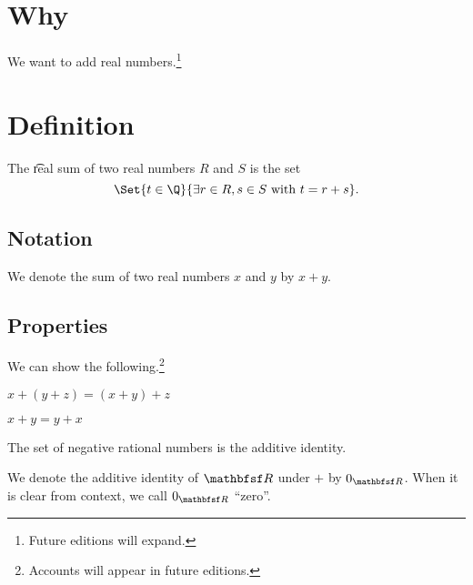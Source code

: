 
\section*{Why}

We want to add real numbers.\footnote{Future editions will expand.}

\section*{Definition}

The \t{real sum} of two real numbers $R$ and $S$ is the set
\[
\Set{t \in \Q }{\exists r \in R, s \in S \text{ with } t = r + s}.
\]

\subsection*{Notation}

We denote the sum of two real numbers $x$ and $y$ by $x + y$.

\subsection*{Properties}

We can show the following.\footnote{Accounts will appear in future editions.}

\begin{proposition}[Associative]
$x + (y + z) = (x + y) + z$

\end{proposition}

\begin{proposition}[Commutative]
$x + y = y + x$
\end{proposition}

\begin{proposition}[Identity]
The set of negative rational numbers is the additive identity.
\end{proposition}

We denote the additive identity of $\R $ under $+$ by $0_{\R }$.
When it is clear from context, we call $0_{\R }$ ``zero''.

\blankpage